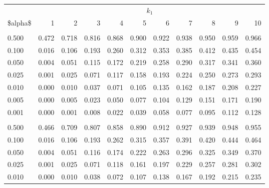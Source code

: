 \documentclass[
]{article}
\begin{document}
\begin{longtable}[t]{lrrrrrrrrrr}
\toprule
\multicolumn{1}{c}{ } & \multicolumn{10}{c}{$k_1$} \\
\cmidrule(l{3pt}r{3pt}){2-11}
\$alpha\$ & 1 & 2 & 3 & 4 & 5 & 6 & 7 & 8 & 9 & 10\\
\midrule
\addlinespace[0.3em]
\multicolumn{11}{l}{\textbf{$k_2=20$}}\\
\hspace{1em}0.500 & 0.472 & 0.718 & 0.816 & 0.868 & 0.900 & 0.922 & 0.938 & 0.950 & 0.959 & 0.966\\
\hspace{1em}0.100 & 0.016 & 0.106 & 0.193 & 0.260 & 0.312 & 0.353 & 0.385 & 0.412 & 0.435 & 0.454\\
\hspace{1em}0.050 & 0.004 & 0.051 & 0.115 & 0.172 & 0.219 & 0.258 & 0.290 & 0.317 & 0.341 & 0.360\\
\hspace{1em}0.025 & 0.001 & 0.025 & 0.071 & 0.117 & 0.158 & 0.193 & 0.224 & 0.250 & 0.273 & 0.293\\
\hspace{1em}0.010 & 0.000 & 0.010 & 0.037 & 0.071 & 0.105 & 0.135 & 0.162 & 0.187 & 0.208 & 0.227\\
\hspace{1em}0.005 & 0.000 & 0.005 & 0.023 & 0.050 & 0.077 & 0.104 & 0.129 & 0.151 & 0.171 & 0.190\\
\hspace{1em}0.001 & 0.000 & 0.001 & 0.008 & 0.022 & 0.039 & 0.058 & 0.077 & 0.095 & 0.112 & 0.128\\
\addlinespace[0.3em]
\multicolumn{11}{l}{\textbf{$k_2=30$}}\\
\hspace{1em}0.500 & 0.466 & 0.709 & 0.807 & 0.858 & 0.890 & 0.912 & 0.927 & 0.939 & 0.948 & 0.955\\
\hspace{1em}0.100 & 0.016 & 0.106 & 0.193 & 0.262 & 0.315 & 0.357 & 0.391 & 0.420 & 0.444 & 0.464\\
\hspace{1em}0.050 & 0.004 & 0.051 & 0.116 & 0.174 & 0.222 & 0.263 & 0.296 & 0.325 & 0.349 & 0.370\\
\hspace{1em}0.025 & 0.001 & 0.025 & 0.071 & 0.118 & 0.161 & 0.197 & 0.229 & 0.257 & 0.281 & 0.302\\
\hspace{1em}0.010 & 0.000 & 0.010 & 0.038 & 0.072 & 0.107 & 0.138 & 0.167 & 0.192 & 0.215 & 0.235\\

\end{longtable}
\end{document}
